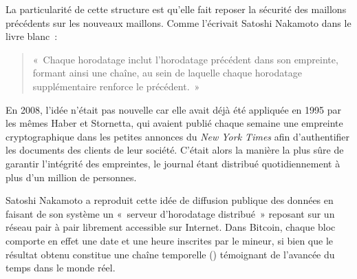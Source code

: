 La particularité de cette structure est qu'elle fait reposer la sécurité des maillons précédents sur les nouveaux maillons. Comme l'écrivait Satoshi Nakamoto dans le livre blanc~: 

\begin{quote}
«~Chaque horodatage inclut l'horodatage précédent dans son empreinte, formant ainsi une chaîne, au sein de laquelle chaque horodatage supplémentaire renforce le précédent.~»
\end{quote}

En 2008, l'idée n'était pas nouvelle car elle avait déjà été appliquée en 1995 par les mêmes Haber et Stornetta, qui avaient publié chaque semaine une empreinte cryptographique dans les petites annonces du \emph{New York Times} afin d'authentifier les documents des clients de leur société. C'était alors la manière la plus sûre de garantir l'intégrité des empreintes, le journal étant distribué quotidiennement à plus d'un million de personnes.


Satoshi Nakamoto a reproduit cette idée de diffusion publique des données en faisant de son système un «~serveur d'horodatage distribué~» reposant sur un réseau pair à pair librement accessible sur Internet. Dans Bitcoin, chaque bloc comporte en effet une date et une heure inscrites par le mineur, si bien que le résultat obtenu constitue une chaîne temporelle () témoignant de l'avancée du temps dans le monde réel.

